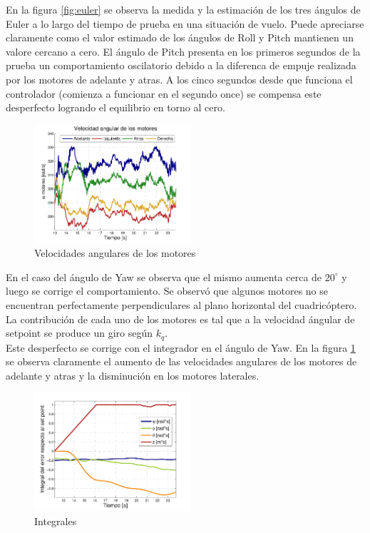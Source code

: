 \documentclass[main]{subfiles}
\begin{document}
En la figura \ref{fig:euler} se observa la medida y la estimaci\'on de los tres \'angulos de Euler a lo largo del tiempo de prueba en una situaci\'on de vuelo. Puede apreciarse claramente como el valor estimado de los \'angulos de Roll y Pitch mantienen un valore cercano a cero. El \'angulo de Pitch presenta en los primeros segundos de la prueba un comportamiento oscilatorio debido a la diferenca de empuje realizada por los motores de adelante y atras. A los cinco segundos desde que funciona el controlador (comienza a funcionar en el segundo once) se compensa este desperfecto logrando el equilibrio en torno al cero.\\

\begin{figure}
	\centering
	\vspace{-20pt}
	\includegraphics[width=0.52\textwidth]{./pics_test_control/w.pdf}
	\caption{Velocidades angulares de los motores}
	\label{fig:w}
\end{figure}

En el caso del \'angulo de Yaw se observa que el mismo aumenta cerca de $20 ^\circ$ y luego se corrige el comportamiento. Se observ\'o que algunos motores no se encuentran perfectamente perpendiculares al plano horizontal del cuadric\'optero. La contribuci\'on de cada uno de los motores es tal que a la velocidad \'angular de setpoint se produce un giro seg\'un $k_q$.\\ 



Este desperfecto se corrige con el integrador en el \'angulo de Yaw. En la figura \ref{fig:w} se observa claramente el aumento de las velocidades angulares de los motores de adelante y atras y la disminuci\'on en los motores laterales.\\ 

\begin{figure}
	\centering
	\vspace{-10pt}
	\includegraphics[width=0.52\textwidth]{./pics_test_control/int.pdf}
	\caption{Integrales}
	\label{fig:int}
\end{figure}
\end{document}
